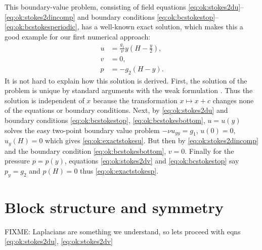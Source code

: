 This boundary-value problem, consisting of field equations \eqref{eq:ok:stokes2du}--\eqref{eq:ok:stokes2dincomp} and boundary conditions \eqref{eq:ok:bcstokestop}--\eqref{eq:ok:bcstokesperiodic}, has a well-known exact solution, which makes this a good example for our first numerical approach:
\begin{align}
u &= \frac{g_1}{\nu} y \left(H - \frac{y}{2}\right), \label{eq:ok:exactstokesu} \\
v &= 0, \label{eq:ok:exactstokesv} \\
p &= -g_2 (H-y).\label{eq:ok:exactstokesp}
\end{align}
It is not hard to explain how this solution is derived.  First, the solution of the problem is unique by standard arguments with the weak formulation \citep[p.~223]{Elmanetal2005}.  Thus the solution is independent of $x$ because the transformation $x\mapsto x+c$ changes none of the equations or boundary conditions.  Next, by \eqref{eq:ok:stokes2du} and boundary conditions \eqref{eq:ok:bcstokestop}, \eqref{eq:ok:bcstokesbottom}, $u=u(y)$ solves the easy two-point boundary value problem $-\nu u_{yy} = g_1$, $u(0)=0$, $u_y(H)=0$ which gives \eqref{eq:ok:exactstokesu}.  But then by \eqref{eq:ok:stokes2dincomp} and the boundary condition \eqref{eq:ok:bcstokesbottom}, $v=0$.  Finally for the pressure $p=p(y)$, equations \eqref{eq:ok:stokes2dv} and \eqref{eq:ok:bcstokestop} say $p_y=g_2$ and $p(H)=0$ thus \eqref{eq:ok:exactstokesp}.


\section{Block structure and symmetry}

FIXME: Laplacians are something we understand, so lets proceed with eqns \eqref{eq:ok:stokes2du}, \eqref{eq:ok:stokes2dv}

